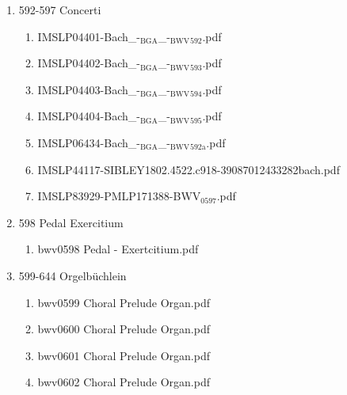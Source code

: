\documentclass[11pt]{article}
\begin{document}
\begin{enumerate}
\begin{enumerate}
\begin{enumerate}
\item 592-597 Concerti
\label{sec-1-1-1-1-44-6-4-1-10}
\begin{enumerate}
\item IMSLP04401-Bach\_-$_{\text{BGA}}$\_-$_{\text{BWV}}$$_{\text{592}}$.pdf
\label{sec-1-1-1-1-44-6-4-1-10-1}

\item IMSLP04402-Bach\_-$_{\text{BGA}}$\_-$_{\text{BWV}}$$_{\text{593}}$.pdf
\label{sec-1-1-1-1-44-6-4-1-10-2}

\item IMSLP04403-Bach\_-$_{\text{BGA}}$\_-$_{\text{BWV}}$$_{\text{594}}$.pdf
\label{sec-1-1-1-1-44-6-4-1-10-3}

\item IMSLP04404-Bach\_-$_{\text{BGA}}$\_-$_{\text{BWV}}$$_{\text{595}}$.pdf
\label{sec-1-1-1-1-44-6-4-1-10-4}

\item IMSLP06434-Bach\_-$_{\text{BGA}}$\_-$_{\text{BWV}}$$_{\text{592a}}$.pdf
\label{sec-1-1-1-1-44-6-4-1-10-5}

\item IMSLP44117-SIBLEY1802.4522.c918-39087012433282bach.pdf
\label{sec-1-1-1-1-44-6-4-1-10-6}

\item IMSLP83929-PMLP171388-BWV$_{\text{0597}}$.pdf
\label{sec-1-1-1-1-44-6-4-1-10-7}
\end{enumerate}

\item 598 Pedal Exercitium
\label{sec-1-1-1-1-44-6-4-1-11}
\begin{enumerate}
\item bwv0598   Pedal - Exertcitium.pdf
\label{sec-1-1-1-1-44-6-4-1-11-1}
\end{enumerate}

\item 599-644 Orgelbüchlein
\label{sec-1-1-1-1-44-6-4-1-12}
\begin{enumerate}
\item bwv0599   Choral Prelude Organ.pdf
\label{sec-1-1-1-1-44-6-4-1-12-1}

\item bwv0600   Choral Prelude Organ.pdf
\label{sec-1-1-1-1-44-6-4-1-12-2}

\item bwv0601   Choral Prelude Organ.pdf
\label{sec-1-1-1-1-44-6-4-1-12-3}

\item bwv0602   Choral Prelude Organ.pdf
\label{sec-1-1-1-1-44-6-4-1-12-4}


\end{enumerate}
\end{enumerate}
\end{enumerate}
\end{enumerate}
\end{document}
